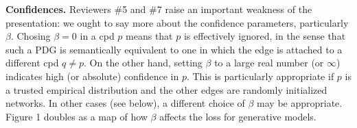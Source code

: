 \documentclass{article}
\theoremstyle{plain}
\theoremstyle{definition}
\newcommand{\dg}[1]{\mathbdcal{#1}}
\newcommand\revc[1]{{\color{revcolor}#1}}
\begin{document}
\textbf{Confidences.}
\revc{Reviewers \#5} and \revc{\#7} raise an important weakness of the presentation: we ought to say more about the confidence parameters, particularly $\beta$.
Chosing $\beta=0$ in a cpd $p$
means that $p$ is effectively ignored, in the sense that such a PDG is semantically equivalent to one in which the edge is attached to a different cpd $q \ne p$.
%
On the other hand, setting $\beta$ to a large real number (or $\infty$) indicates high (or absolute) confidence in $p$.  This is particularly appropriate if $p$ is a trusted empirical distribution
and the other edges are randomly initialized networks.
In other cases (see below), a different choice of $\beta$ may be appropriate.
Figure 1 doubles as a map of how $\beta$
affects the loss for generative models.


\end{document}
